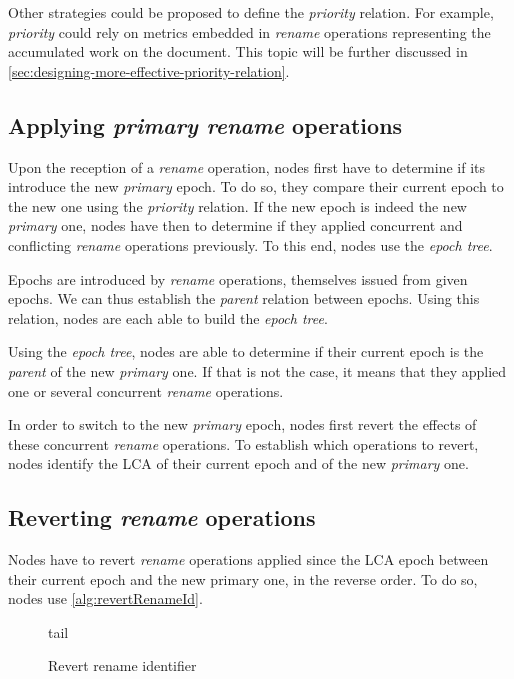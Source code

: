 \documentclass[10pt,journal,compsoc]{IEEEtran}
\let\MYoriglatexcaption\caption
\renewcommand{\caption}[2][\relax]{\MYoriglatexcaption[#2]{#2}}
\begin{document}
Other strategies could be proposed to define the \emph{priority} relation.
For example, \emph{priority} could rely on metrics embedded in \emph{rename} operations representing the accumulated work on the document.
This topic will be further discussed in \autoref{sec:designing-more-effective-priority-relation}.

\subsection{Applying \emph{primary rename} operations}

Upon the reception of a \emph{rename} operation, nodes first have to determine if its introduce the new \emph{primary} epoch.
To do so, they compare their current epoch to the new one using the \emph{priority} relation.
If the new epoch is indeed the new \emph{primary} one, nodes have then to determine if they applied concurrent and conflicting \emph{rename} operations previously.
To this end, nodes use the \emph{epoch tree}.

Epochs are introduced by \emph{rename} operations, themselves issued from given epochs.
We can thus establish the \emph{parent} relation between epochs.
Using this relation, nodes are each able to build the \emph{epoch tree}.

Using the \emph{epoch tree}, nodes are able to determine if their current epoch is the \emph{parent} of the new \emph{primary} one.
If that is not the case, it means that they applied one or several concurrent \emph{rename} operations.

In order to switch to the new \emph{primary} epoch, nodes first revert the effects of these concurrent \emph{rename} operations.
To establish which operations to revert, nodes identify the \ac{LCA} of their current epoch and of the new \emph{primary} one.

\subsection{Reverting \emph{rename} operations}
\label{sec:reverting-rename-op}

Nodes have to revert \emph{rename} operations applied since the \ac{LCA} epoch between their current epoch and the new primary one, in the reverse order.
To do so, nodes use \autoref{alg:revertRenameId}.

\begin{figure}
    \begin{algorithmic}
            \State \Return tail
        \EndFunction
    \end{algorithmic}
    \caption{Revert rename identifier}
    \label{alg:revertRenameId}
\end{figure}
\end{document}
